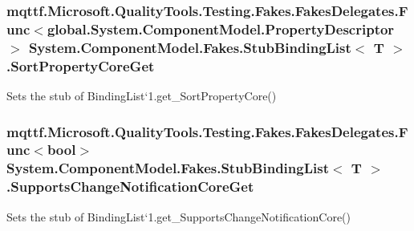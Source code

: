 \hypertarget{class_system_1_1_component_model_1_1_fakes_1_1_stub_binding_list_3_01_t_01_4_ad627f65eae0221bfc8afe7846c93fa07}{
\subsubsection[{Sort\-Property\-Core\-Get}]{\setlength{\rightskip}{0pt plus 5cm}mqttf.\-Microsoft.\-Quality\-Tools.\-Testing.\-Fakes.\-Fakes\-Delegates.\-Func$<$global.\-System.\-Component\-Model.\-Property\-Descriptor$>$ System.\-Component\-Model.\-Fakes.\-Stub\-Binding\-List$<$ T $>$.Sort\-Property\-Core\-Get}}\label{class_system_1_1_component_model_1_1_fakes_1_1_stub_binding_list_3_01_t_01_4_ad627f65eae0221bfc8afe7846c93fa07}


Sets the stub of Binding\-List`1.get\-\_\-\-Sort\-Property\-Core()

\hypertarget{class_system_1_1_component_model_1_1_fakes_1_1_stub_binding_list_3_01_t_01_4_a07abd52e76400fa1f004dbf69d69d18c}{
\subsubsection[{Supports\-Change\-Notification\-Core\-Get}]{\setlength{\rightskip}{0pt plus 5cm}mqttf.\-Microsoft.\-Quality\-Tools.\-Testing.\-Fakes.\-Fakes\-Delegates.\-Func$<$bool$>$ System.\-Component\-Model.\-Fakes.\-Stub\-Binding\-List$<$ T $>$.Supports\-Change\-Notification\-Core\-Get}}\label{class_system_1_1_component_model_1_1_fakes_1_1_stub_binding_list_3_01_t_01_4_a07abd52e76400fa1f004dbf69d69d18c}


Sets the stub of Binding\-List`1.get\-\_\-\-Supports\-Change\-Notification\-Core()

